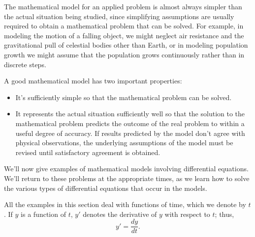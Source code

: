 The mathematical model for an applied problem is almost always simpler
than the actual situation being studied, since simplifying assumptions
are usually required to obtain a mathematical problem that can be
solved. For example, in modeling the motion of a falling object, we
might neglect air resistance and the gravitational pull of celestial
bodies other than Earth, or in  modeling  population growth we
might assume that the population grows continuously rather than in
discrete steps.

A good mathematical model has two important properties:

\begin{itemize}
\item It's sufficiently simple so that the mathematical problem
can be solved.

\item It represents the actual situation sufficiently well so that the
solution to the mathematical problem predicts the outcome of the real
problem to within a useful degree of accuracy. If results predicted by
the model don't agree with physical observations, the
underlying
assumptions of the model must be revised until satisfactory agreement
is obtained.
\end{itemize}

We'll  now give  examples of mathematical models involving
differential equations. We'll return to these problems at the
appropriate times, as we learn how to solve the various types of
differential equations that occur in the models.

All the examples in this section deal with functions of time, which we
 denote by $t$. If $y$ is a function of $t$,  $y'$
denotes the derivative of $y$ with respect to $t$;   thus,
\[
y'=\frac{dy}{dt}.
\]


